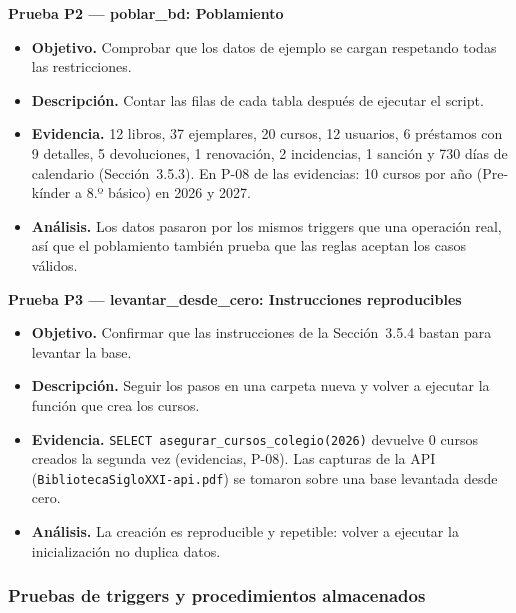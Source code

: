 \documentclass[11pt,a4paper]{article}
\begin{document}
\textbf{Prueba P2 --- poblar\_bd: Poblamiento}
\begin{itemize}[nosep]
\item \textbf{Objetivo.} Comprobar que los datos de ejemplo se cargan respetando todas las restricciones.
\item \textbf{Descripción.} Contar las filas de cada tabla después de ejecutar el script.
\item \textbf{Evidencia.} 12 libros, 37 ejemplares, 20 cursos, 12 usuarios, 6 préstamos con 9 detalles, 5 devoluciones, 1 renovación, 2 incidencias, 1 sanción y 730 días de calendario (Sección~3.5.3). En P-08 de las evidencias: 10 cursos por año (Pre-kínder a 8.º básico) en 2026 y 2027.
\item \textbf{Análisis.} Los datos pasaron por los mismos triggers que una operación real, así que el poblamiento también prueba que las reglas aceptan los casos válidos.
\end{itemize}

\textbf{Prueba P3 --- levantar\_desde\_cero: Instrucciones reproducibles}
\begin{itemize}[nosep]
\item \textbf{Objetivo.} Confirmar que las instrucciones de la Sección~3.5.4 bastan para levantar la base.
\item \textbf{Descripción.} Seguir los pasos en una carpeta nueva y volver a ejecutar la función que crea los cursos.
\item \textbf{Evidencia.} \texttt{SELECT asegurar\_cursos\_colegio(2026)} devuelve 0 cursos creados la segunda vez (evidencias, P-08). Las capturas de la API (\texttt{BibliotecaSigloXXI-api.pdf}) se tomaron sobre una base levantada desde cero.
\item \textbf{Análisis.} La creación es reproducible y repetible: volver a ejecutar la inicialización no duplica datos.
\end{itemize}

\subsubsection{Pruebas de triggers y procedimientos almacenados}
\end{document}
